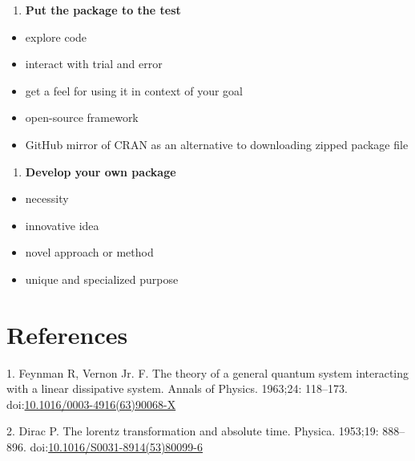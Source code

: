 \documentclass[10pt,letterpaper]{article}
\providecommand{\tightlist}{%
  \setlength{\itemsep}{0pt}\setlength{\parskip}{0pt}}
\begin{document}
\begin{enumerate}
\def\labelenumi{\arabic{enumi}.}
\setcounter{enumi}{8}
\tightlist
\item
  \textbf{Put the package to the test}
\end{enumerate}

\begin{itemize}
\tightlist
\item
  explore code
\item
  interact with trial and error
\item
  get a feel for using it in context of your goal
\item
  open-source framework
\item
  GitHub mirror of CRAN as an alternative to downloading zipped package
  file
\end{itemize}

\begin{enumerate}
\def\labelenumi{\arabic{enumi}.}
\setcounter{enumi}{9}
\tightlist
\item
  \textbf{Develop your own package}
\end{enumerate}

\begin{itemize}
\tightlist
\item
  necessity
\item
  innovative idea
\item
  novel approach or method
\item
  unique and specialized purpose
\end{itemize}

\hypertarget{references}{%
\section*{References}\label{references}}

\hypertarget{refs}{}
\leavevmode\hypertarget{ref-Feynman1963118}{}%
1. Feynman R, Vernon Jr. F. The theory of a general quantum system
interacting with a linear dissipative system. Annals of Physics.
1963;24: 118--173.
doi:\href{https://doi.org/10.1016/0003-4916(63)90068-X}{10.1016/0003-4916(63)90068-X}

\leavevmode\hypertarget{ref-Dirac1953888}{}%
2. Dirac P. The lorentz transformation and absolute time. Physica.
1953;19: 888--896.
doi:\href{https://doi.org/10.1016/S0031-8914(53)80099-6}{10.1016/S0031-8914(53)80099-6}

\nolinenumbers
\end{document}
